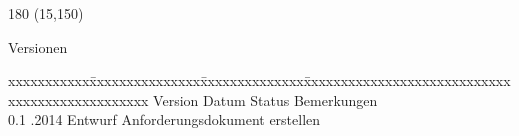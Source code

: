 
\begin{textblock}{180} (15,150)
\color{black}
\begin{huge}
Versionen
\end{huge}
\vspace{10mm}

\fontsize{10pt}{18pt}\selectfont
\begin{tabbing}
xxxxxxxxxxx\=xxxxxxxxxxxxxxx\=xxxxxxxxxxxxxx\=xxxxxxxxxxxxxxxxxxxxxxxxxxxxxxxxxxxxxxxxxxxxxxx \kill
Version	\> Datum	\> Status		\> Bemerkungen		\\
0.1	.2014	\> Entwurf		\> Anforderungsdokument erstellen	\\	
\end{tabbing}

\end{textblock}
